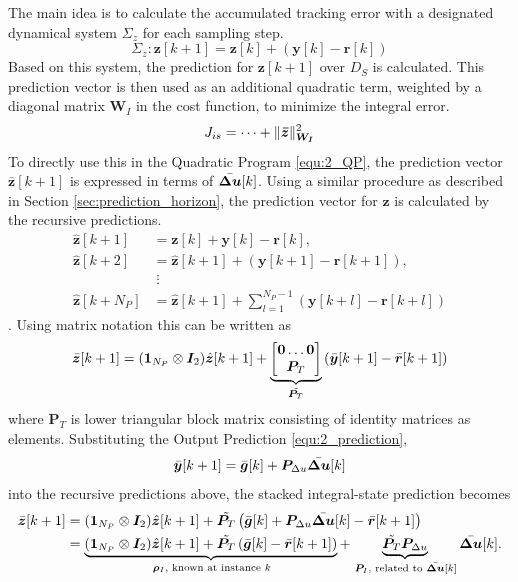 The main idea is to calculate the accumulated tracking error with a designated dynamical system $\Sigma_z$ for each sampling step.
\[
\Sigma_z : \bm z[k+1] = \bm z[k] + (\bm y[k] - \bm r[k])
\]
Based on this system, the prediction for $\bm z[k+1]$ over $D_S$ is calculated. This prediction vector is then used as an additional quadratic term, weighted by a diagonal matrix $\bm{W}_I$ in the cost function, to minimize the integral error.
\begin{equation}
	J_{is} = \dots + \wLNorm{\bar{z}}{W_I}%
	\label{equ:2_Jis}
\end{equation}
 To directly use this in the Quadratic Program \eqref{equ:2_QP}, the prediction vector $\bar{\bm{z}}[k+1]$ is expressed in terms of $\Bar{\bm{\Delta u}}[k]$. Using a similar procedure as described in Section \ref{sec:prediction_horizon}, the prediction vector for $\bm z$ is calculated by the recursive predictions.
 \begin{align*}
 	\hat{\bm z}[k+1]
 	&=
 	\bm z[k] + \bm y[k] - \bm r[k],\\
 	\hat{\bm z}[k+2]
 	&=
 	\hat{\bm z}[k+1] 
 	+ \left(\bm y[k+1]-\bm r[k+1]\right),\\
 	&\;\vdots\\
 	\hat{\bm z}[k+N_P]
 	&=
 	\hat{\bm z}[k+1]
 	+
 	\sum_{l=1}^{N_P-1}
 	\left(\bm y[k+l]-\bm r[k+l]\right)
 \end{align*}. 
 Using matrix notation this can be written as
 \[
 \Bar{\bm z}[k+1]	=
 (\bm{1}_{N_P}\otimes\bm{I}_2) \hat{\bm z}[k+1]
 +
 \underbrace{
 \begin{bmatrix}
    \bm{0} \hdots \bm{0}\\
    \bm{P}_T
 \end{bmatrix}}_{\tilde{\bm{P}_T}}
 \left(
 \bar{\bm{y}}[k+1]
 -
 \Bar{\bm r}[k+1]
 \right)
 \]
 where $\bm{P}_T$ is lower triangular block matrix consisting of identity matrices as elements.
 Substituting the Output Prediction \eqref{equ:2_prediction},
 \[
 \bar{\bm{y}}[k+1]
 =
 \bar{\bm{g}}[k]
 +
 \bm{P}_{\Delta u}\Bar{\bm{\Delta u}}[k]
 \]
 into the recursive predictions above, the stacked integral-state
 prediction becomes
 \begin{align*}
 	\Bar{\bm z}[k+1]
 	&=
 	(\bm{1}_{N_P}\otimes\bm{I}_2)\hat{\bm z}[k+1]
 	+
 	{\tilde{\bm{P}_T}}
 	\left(
 	\bar{\bm{g}}[k]
 	+
 	\bm{P}_{\Delta u}\Bar{\bm{\Delta u}}[k]
 	-
 	\Bar{\bm r}[k+1]
 	\right)\\
 	&=
 	\underbrace{
 		(\bm{1}_{N_P}\otimes\bm{I}_2)\hat{\bm z}[k+1]
 		+
 		{\tilde{\bm{P}_T}}
 		\left(
 		\bar{\bm{g}}[k]-\Bar{\bm r}[k+1]
 		\right)
 	}_{\,\bm{\rho}_I\text{, known at instance }k}
 	+
 	\underbrace{
 		{\tilde{\bm{P}_T}}\bm{P}_{\Delta u}
 	}_{\,\bm{P}_I\text{, related to }\Bar{\bm{\Delta u}}[k]}
 	\Bar{\bm{\Delta u}}[k].
 \end{align*}
